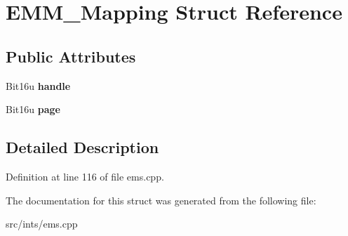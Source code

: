 \hypertarget{structEMM__Mapping}{\section{E\-M\-M\-\_\-\-Mapping Struct Reference}
\label{structEMM__Mapping}
}
\subsection*{Public Attributes}
\begin{DoxyCompactItemize}
\item 
\hypertarget{structEMM__Mapping_ad13a2505af53bc579fa4c22f16662352}{Bit16u {\bfseries handle}}\label{structEMM__Mapping_ad13a2505af53bc579fa4c22f16662352}

\item 
\hypertarget{structEMM__Mapping_a6baabf698f20e90db2a2c5ec18505237}{Bit16u {\bfseries page}}\label{structEMM__Mapping_a6baabf698f20e90db2a2c5ec18505237}

\end{DoxyCompactItemize}


\subsection{Detailed Description}


Definition at line 116 of file ems.\-cpp.



The documentation for this struct was generated from the following file\-:\begin{DoxyCompactItemize}
\item 
src/ints/ems.\-cpp\end{DoxyCompactItemize}
